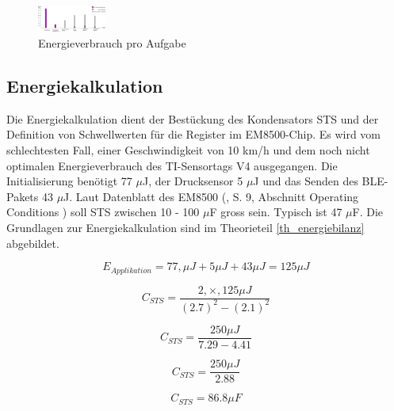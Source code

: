 \begin{figure}
  \includegraphics[width=0.2\textwidth]{3Vorgehen/imag/Energy_pro_Aufgabe.png}
  \caption{Energieverbrauch pro Aufgabe}
  \label{energie_zsm}
\end{figure}










\newpage


\subsection{Energiekalkulation}
\label{v_e_kalkulation}

Die Energiekalkulation dient der Bestückung des Kondensators STS und der Definition von Schwellwerten für die Register im EM8500-Chip. Es wird vom schlechtesten  Fall, einer Geschwindigkeit von 10 km/h und dem noch nicht optimalen Energieverbrauch des TI-Sensortags V4 ausgegangen. Die Initialisierung benötigt 77 $\mu$J, der Drucksensor 5 $\mu$J und das Senden des BLE-Pakets 43 $\mu$J. Laut Datenblatt des EM8500 (\cite{datasheet_EM85}, S. 9, Abschnitt Operating Conditions ) soll STS zwischen 10 - 100 $\mu$F gross sein. Typisch ist 47 $\mu$F. Die Grundlagen zur Energiekalkulation sind im Theorieteil \ref{th_energiebilanz} abgebildet. 

\begin{equation}
  E_{Applikation} = 77, \mu J + 5 \mu J + 43 \mu J = 125 \mu J
\end{equation}


\begin{equation}
  C_{STS}= \frac{2,\times, 125 \mu J}{(2.7)^2 - (2.1)^2}
\end{equation}

\begin{equation}
  C_{STS}= \frac{ 250 \mu J}{7.29 - 4.41}
\end{equation}

\begin{equation}
  C_{STS}= \frac{ 250 \mu J}{2.88}
\end{equation}

\begin{equation}
  C_{STS}= 86.8 \mu F
\end{equation}

